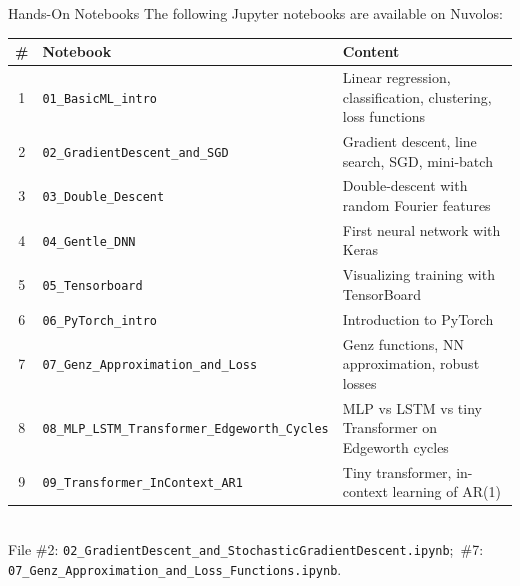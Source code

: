 \documentclass[aspectratio=169,11pt]{beamer}
\begin{document}
\begin{frame}{Hands-On Notebooks}
The following Jupyter notebooks are available on Nuvolos:

\vspace{0.3cm}
\begin{center}
{\scriptsize
\renewcommand{\arraystretch}{1.15}
\begin{tabular}{clp{5.2cm}}
\toprule
\textbf{\#} & \textbf{Notebook} & \textbf{Content} \\
\midrule
1 & \texttt{01\_BasicML\_intro} & Linear regression, classification, clustering, loss functions \\
2 & \texttt{02\_GradientDescent\_and\_SGD} & Gradient descent, line search, SGD, mini-batch \\
3 & \texttt{03\_Double\_Descent} & Double-descent with random Fourier features \\
4 & \texttt{04\_Gentle\_DNN} & First neural network with Keras \\
5 & \texttt{05\_Tensorboard} & Visualizing training with TensorBoard \\
6 & \texttt{06\_PyTorch\_intro} & Introduction to PyTorch \\
7 & \texttt{07\_Genz\_Approximation\_and\_Loss} & Genz functions, NN approximation, robust losses \\
8 & \texttt{08\_MLP\_LSTM\_Transformer\_Edgeworth\_Cycles} & MLP vs LSTM vs tiny Transformer on Edgeworth cycles \\
9 & \texttt{09\_Transformer\_InContext\_AR1} & Tiny transformer, in-context learning of AR(1) \\
\bottomrule
\end{tabular}
\vspace{0.2cm}\\
{\tiny File \#2: \texttt{02\_GradientDescent\_and\_StochasticGradientDescent.ipynb};\ \#7: \texttt{07\_Genz\_Approximation\_and\_Loss\_Functions.ipynb}.}
}%
\end{center}
\end{frame}
\end{document}

